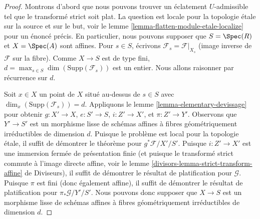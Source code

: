 \begin{proof}
Montrons d'abord que nous pouvons trouver un éclatement $U$-admissible tel que le
transformé strict soit plat. La question est locale pour la topologie \'etale sur la source
et sur le but, voir le
lemme \ref{lemma-flatten-module-etale-localize} pour un énoncé précis.
En particulier, nous pouvons supposer que $S = \Spec(R)$ et $X = \Spec(A)$
sont affines. Pour $s \in S$, écrivons $\mathcal{F}_s = \mathcal{F}|_{X_s}$
(image inverse de $\mathcal{F}$ sur la fibre). Comme $X \to S$ est de type fini,
$d = \max_{s \in S} \dim(\text{Supp}(\mathcal{F}_s))$
est un entier. Nous allons raisonner par récurrence sur $d$.

\medskip\noindent
Soit $x \in X$ un point de $X$ situé au-dessus de $s \in S$ avec
$\dim_x(\text{Supp}(\mathcal{F}_s)) = d$.
Appliquons le lemme \ref{lemma-elementary-devissage} pour obtenir
$g : X' \to X$, $e : S' \to S$, $i : Z' \to X'$, et $\pi : Z' \to Y'$.
Observons que $Y' \to S'$ est
un morphisme lisse de schémas affines à fibres géométriquement irréductibles
de dimension $d$. Puisque le problème est local pour la topologie \'etale, il suffit
de démontrer le théorème pour $g^*\mathcal{F}/X'/S'$. Puisque $i : Z' \to X'$
est une immersion fermée de présentation finie (et puisque le transformé strict
commute à l'image directe affine, voir le
lemme \ref{divisors-lemma-strict-transform-affine} de Diviseurs),
il suffit de démontrer le résultat de platification pour $\mathcal{G}$.
Puisque $\pi$ est fini (donc également affine), il suffit de démontrer le
résultat de platification pour $\pi_*\mathcal{G}/Y'/S'$. Nous pouvons donc supposer
que $X \to S$ est un morphisme lisse de schémas affines à fibres
géométriquement irréductibles de dimension $d$.


\end{proof}
